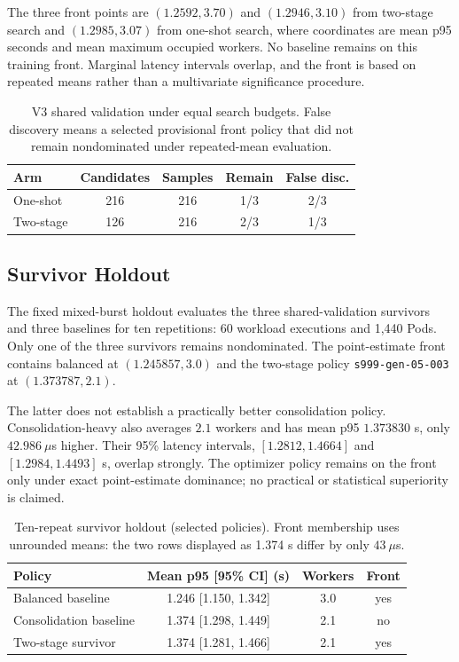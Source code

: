 \documentclass[conference]{IEEEtran}
\begin{document}
The three front points are $(1.2592,3.70)$ and $(1.2946,3.10)$ from two-stage search and $(1.2985,3.07)$ from one-shot search, where coordinates are mean p95 seconds and mean maximum occupied workers. No baseline remains on this training front. Marginal latency intervals overlap, and the front is based on repeated means rather than a multivariate significance procedure.

\begin{table}[t]
\caption{V3 shared validation under equal search budgets. False discovery means a selected provisional front policy that did not remain nondominated under repeated-mean evaluation.}
\label{tab:v3-validation}
\centering
\scriptsize
\begin{tabular}{lcccc}
\toprule
Arm & Candidates & Samples & Remain & False disc. \\
\midrule
One-shot & 216 & 216 & 1/3 & 2/3 \\
Two-stage & 126 & 216 & 2/3 & 1/3 \\
\bottomrule
\end{tabular}
\end{table}

\subsection{Survivor Holdout}
The fixed mixed-burst holdout evaluates the three shared-validation survivors and three baselines for ten repetitions: 60 workload executions and 1,440 Pods. Only one of the three survivors remains nondominated. The point-estimate front contains balanced at $(1.245857,3.0)$ and the two-stage policy \texttt{s999-gen-05-003} at $(1.373787,2.1)$.

The latter does not establish a practically better consolidation policy. Consolidation-heavy also averages $2.1$ workers and has mean p95 $1.373830$ s, only $42.986~\mu$s higher. Their 95\% latency intervals, $[1.2812,1.4664]$ and $[1.2984,1.4493]$ s, overlap strongly. The optimizer policy remains on the front only under exact point-estimate dominance; no practical or statistical superiority is claimed.

\begin{table}[t]
\caption{Ten-repeat survivor holdout (selected policies). Front membership uses unrounded means: the two rows displayed as 1.374 s differ by only $43~\mu$s.}
\label{tab:v3-holdout}
\centering
\scriptsize
\begin{tabular}{lccc}
\toprule
Policy & Mean p95 [95\% CI] (s) & Workers & Front \\
\midrule
Balanced baseline & 1.246 [1.150, 1.342] & 3.0 & yes \\
Consolidation baseline & 1.374 [1.298, 1.449] & 2.1 & no \\
Two-stage survivor & 1.374 [1.281, 1.466] & 2.1 & yes \\
\bottomrule
\end{tabular}
\end{table}
\end{document}
